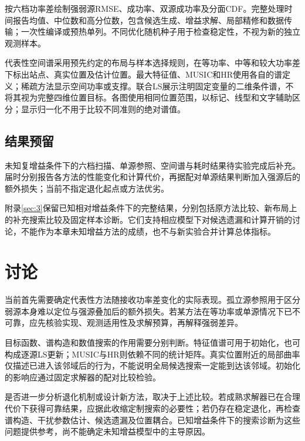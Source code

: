 按六档功率差绘制强弱源RMSE、成功率、双源成功率及分面CDF。完整处理时间报告均值、中位数和高分位数，包含候选生成、增益求解、局部精修和数据传输；一次性编译或预热单列。不同优化随机种子用于检查稳定性，不视为新的独立观测样本。

代表性空间谱采用预先约定的布局与样本选择规则，在等功率、中等和较大功率差下标出站点、真实位置及估计位置。最大特征值、MUSIC和HR使用各自的谱定义；稀疏方法显示空间功率或支撑。联合LS展示注明固定变量的二维条件谱，不将其视为完整四维位置目标。各图使用相同位置范围，以标记、线型和文字辅助区分；显示归一化不用于比较不同准则的绝对谱值。

\subsection{结果预留}\label{sec:ug-results}
未知复增益条件下的六档扫描、单源参照、空间谱与耗时结果待实验完成后补充。届时分别报告各方法的性能变化和计算代价，再据配对单源结果判断加入强源后的额外损失；当前不指定退化起点或方法优劣。

附录\ref{sec:3}保留已知相对增益条件下的完整结果，分别包括原方法比较、新布局上的补充搜索比较及固定样本诊断。它们支持相应模型下对候选遗漏和计算开销的讨论，不能作为本章未知增益方法的成绩，也不与新实验合并计算总体指标。

\section{讨论}\label{sec:ug-discussion}
当前首先需要确定代表性方法随接收功率差变化的实际表现。孤立源参照用于区分弱源本身难以定位与强源叠加后的额外损失。若某方法在等功率或单源情况下已不可靠，应先核验实现、观测适用性及求解预算，再解释强弱差异。

目标函数、谱构造和数值搜索的作用需要分别判断。特征值谱可用于初始化，也可构成逐源LS更新；MUSIC与HR则依赖不同的统计矩阵。真实位置附近的局部曲率仅描述已进入该邻域后的行为，不能说明全局候选搜索一定能到达该邻域。初始化的影响应通过固定求解器的配对比较检验。

是否进一步分析退化机制或设计新方法，取决于上述比较。若成熟求解器已在合理代价下获得可靠结果，应据此收缩定制搜索的必要性；若仍存在稳定退化，再检查谱构造、干扰参数估计、候选遗漏及位置耦合。已知增益条件下的搜索诊断为这些问题提供参考，尚不能确定未知增益模型中的主导原因。
